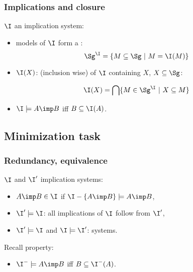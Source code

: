 \begin{frame}
\frametitle{Implications and closure}

$\I$ an implication system:
\begin{itemize}
\item models of $\I$ form a :
\[ \Sg^{\I} = \{ M \subseteq \Sg \ | \ M = \I(M) \} \]

\vspace{1.2em}

\item {} $\I(X)$:  (inclusion wise) of $\I$ containing $X$, $X \subseteq \Sg$: 

\[ \I(X) = \bigcap \{ M \in \Sg^{\I} \ | \ X \subseteq M \} \]

\item $\I \models A \imp B$ iff $B \subseteq \I(A)$.
\end{itemize}

\end{frame}



\subsection{Minimization task}

\begin{frame}
\frametitle{Redundancy, equivalence}

$\I$ and $\I'$ implication systems:
\begin{itemize}
	\item $A \imp B \in \I$  if $\I - \{A \imp B\} \models A \imp B$,
	\item $\I' \models \I$: all implications of $\I$ follow from $\I'$,
	\item $\I' \models \I$ and $\I \models \I'$:  systems.
\end{itemize}

\vspace{1.2em}

\begin{lightreminder}
	Recall property: 
	\begin{itemize}
		\item $\I^{-} \models A \imp B$ iff $B \subseteq \I^{-}(A)$.
	\end{itemize}
\end{lightreminder}

\end{frame}

